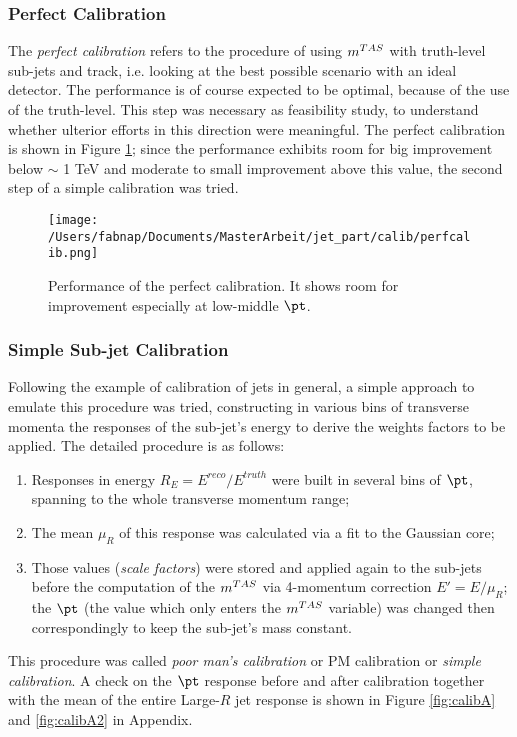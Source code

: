 \subsubsection{Perfect Calibration}
The \textit{perfect calibration} refers to the procedure of using $m^{TAS}$ with truth-level sub-jets and track, i.e. looking at the best possible scenario with an ideal detector. The performance is of course expected to be optimal, because of the use of the truth-level. This step was necessary as feasibility study, to understand whether ulterior efforts in this direction were meaningful.
The perfect calibration is shown in Figure \ref{fig:perfcalib}; since the performance exhibits room for big improvement below $\sim$ 1 TeV and moderate to small improvement above this value, the second step of a simple calibration was tried.

\begin{figure}[!ht]
  \centering
      \texttt{[image: /Users/fabnap/Documents/MasterArbeit/jet\_part/calib/perfcalib.png]}
  \caption[Perfect calibration]{Performance of the perfect calibration. It shows room for improvement especially at low-middle $\pt$.}
  \label{fig:perfcalib}
\end{figure}


\subsubsection{Simple Sub-jet Calibration}
Following the example of calibration of jets in general, a simple approach to emulate this procedure was tried, constructing in various bins of transverse momenta the responses of the sub-jet's energy to derive the weights factors to be applied. The detailed procedure is as follows:
\begin{enumerate}
 \item Responses in energy $R_E=E^{reco}/E^{truth}$ were built in several bins of $\pt$, spanning to the whole transverse momentum range;
 \item The mean $\mu_R$ of this response was calculated via a fit to the Gaussian core;
 \item Those values (\textit{scale factors}) were stored and applied again to the sub-jets before the computation of the $m^{TAS}$ via 4-momentum correction $E'=E/\mu_R$; the $\pt$ (the value which only enters the $m^{TAS}$ variable) was changed then correspondingly to keep the sub-jet's mass constant.
\end{enumerate}

This procedure was called \textit{poor man's calibration} or PM calibration or \textit{simple calibration}.
A check on the $\pt$ response before and after calibration together with the mean of the entire Large-$R$ jet response is shown in Figure \ref{fig:calibA} and \ref{fig:calibA2} in Appendix.


